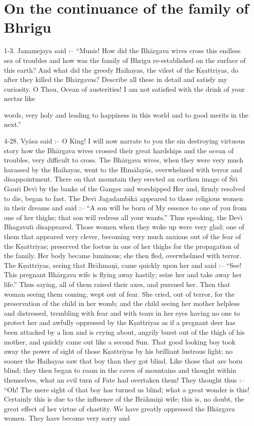 \chapter{On the continuance of the family of Bhrigu}

1-3. Janamejaya said :-- ``Munis! How did the Bh\=argava wives cross this endless sea of troubles and how was the family of Bhrigu re-established on the surface of this earth? And what did the greedy Haihayas, the vilest of the K\d{s}attriyas, do after they killed the Bh\=argavas? Describe all these in detail and satisfy my curiosity. O Thou, Ocean of austerities! I am not satisfied with the drink of your nectar like

words, very holy and leading to happiness in this world and to good merits in the next.''

4-28. Vy\=asa said :-- O King! I will now narrate to you the sin destroying virtuous story how the Bh\=argava wives crossed their great hardships and the ocean of troubles, very difficult to cross. The Bh\=argava wives, when they were very much harassed by the Haihayas, went to the Him\=alay\=as, overwhelmed with terror and disappointment. There on that mountain they erected an earthen image of \'Sr\={\i} Gaur\={\i} Dev\={\i} by the banks of the Ganges and worshipped Her and, firmly resolved to die, began to fast. The Dev\={\i} Jagadambik\=a appeared to those religious women in their dreams and said :-- ``A son will be born of My essence to one of you from one of her thighs; that son will redress all your wants.'' Thus speaking, the Dev\={\i} Bhagavat\={\i} disappeared. Those women when they woke up were very glad; one of them that appeared very clever, becoming very much anxious out of the fear of the K\d{s}attriyas; preserved the foetus in one of her thighs for the propagation of the family. Her body became luminous; she then fled, overwhelmed with terror. The K\d{s}attriyas, seeing that Br\=ahma\d{n}\={\i}, came quickly upon her and said :-- ``See! This pregnant Bh\=argava wife is flying away hastily; seize her and take away her life.'' Thus saying, all of them raised their axes, and pursued her. Then that woman seeing them coming, wept out of fear. She cried, out of terror, for the preservation of the child in her womb; and the child seeing her mother helpless and distressed, trembling with fear and with tears in her eyes having no one to protect her and awfully oppressed by the K\d{s}attriyas as if a pregnant deer has been attacked by a lion and is crying about, angrily burst out of the thigh of his mother, and quickly came out like a second Sun. That good looking boy took away the power of sight of those K\d{s}attriyas by his brilliant lustrous light; no sooner the Haihayas saw that boy than they got blind. Like those that are born blind; they then began to roam in the caves of mountains and thought within themselves, what an evil turn of Fate had overtaken them! They thought thus :-- ``Oh! The mere sight of that boy has turned us blind; what a great wonder is this! Certainly this is due to the influence of the Br\=ahmi\d{n}\={\i} wife; this is, no doubt, the great effect of her virtue of chastity. We have greatly oppressed the Bh\=argava women. They have become very sorry and 